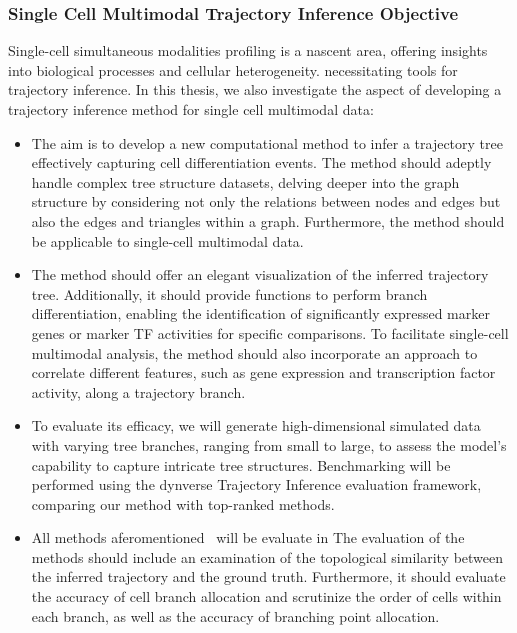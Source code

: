 \subsubsection{Single Cell Multimodal Trajectory Inference Objective}
Single-cell simultaneous modalities profiling is a nascent area, offering insights into biological processes and cellular heterogeneity. necessitating tools for trajectory inference. In this thesis, we also investigate the aspect of developing a trajectory inference method for single cell multimodal data:
\begin{itemize}
	\item
	The aim is to develop a new computational method to infer a trajectory tree effectively capturing cell differentiation events. The method should adeptly handle complex tree structure datasets, delving deeper into the graph structure by considering not only the relations between nodes and edges but also the edges and triangles within a graph. Furthermore, the method should be applicable to single-cell multimodal data.

	\item
	The method should offer an elegant visualization of the inferred trajectory tree. Additionally, it should provide functions to perform branch differentiation, enabling the identification of significantly expressed marker genes or marker TF activities for specific comparisons. To facilitate single-cell multimodal analysis, the method should also incorporate an approach to correlate different features, such as gene expression and transcription factor activity, along a trajectory branch.

	\item
	To evaluate its efficacy, we will generate high-dimensional simulated data with varying tree branches, ranging from small to large, to assess the model's capability to capture intricate tree structures. Benchmarking will be performed using the dynverse Trajectory Inference evaluation framework, comparing our method with top-ranked methods.

	\item
	All methods aferomentioned~ will be evaluate in  The evaluation of the methods should include an examination of the topological similarity between the inferred trajectory and the ground truth. Furthermore, it should evaluate the accuracy of cell branch allocation and scrutinize the order of cells within each branch, as well as the accuracy of branching point allocation.


\end{itemize}
